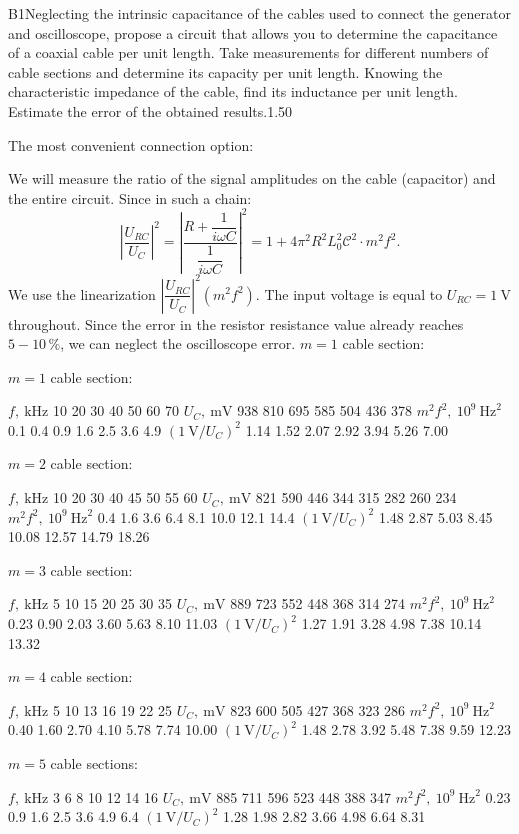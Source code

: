 \documentclass[11pt,a4paper]{article}
\begin{document}
\begin{solcard}{B1}{Neglecting the intrinsic capacitance of the cables used to connect the generator and oscilloscope, propose a circuit that allows you to determine the capacitance of a coaxial cable per unit length. Take measurements for different numbers of cable sections and determine its capacity per unit length. Knowing the characteristic impedance of the cable, find its inductance per unit length. Estimate the error of the obtained results.}{1.50}

The most convenient connection option:


We will measure the ratio of the signal amplitudes on the cable (capacitor) and the entire circuit. Since in such a chain: \[\left|\dfrac{U_{RC}}{U_{C}}\right|^2=\left|\dfrac{R+\dfrac{1}{i\omega C}}{\dfrac{1}{i\omega C}}\right|^2=1+4\pi^2R^2L_0^2\mathcal C^2\cdot m^2f^2.\]We use the linearization $\left|\dfrac{U_{RC}}{U_{C}}\right|^2\left(m^2f^2\right)$. The input voltage is equal to $U_{RC}=1~\mathrm{V}$ throughout. Since the error in the resistor resistance value already reaches $5-10\,\%$, we can neglect the oscilloscope error. $m=1$ cable section:


$m=1$ cable section:


$f,~\mathrm{kHz}$ 10 20 30 40 50 60 70 $U_{C}, ~\mathrm{mV}$ 938 810 695 585 504 436 378 $m^2f^2,~10^9~\mathrm{Hz}^2$ 0.1 0.4 0.9 1.6 2.5 3.6 4.9 $(1~\mathrm{V}/U_C)^2$ 1.14 1.52 2.07 2.92 3.94 5.26 7.00


$m=2$ cable section:


$f,~\mathrm{kHz}$ 10 20 30 40 45 50 55 60 $U_{C}, ~\mathrm{mV}$ 821 590 446 344 315 282 260 234 $m^2f^2,~10^9~\mathrm{Hz}^2$ 0.4 1.6 3.6 6.4 8.1 10.0 12.1 14.4 $(1~\mathrm{V}/U_C)^2$ 1.48 2.87 5.03 8.45 10.08 12.57 14.79 18.26


$m=3$ cable section:


$f,~\mathrm{kHz}$ 5 10 15 20 25 30 35 $U_{C}, ~\mathrm{mV}$ 889 723 552 448 368 314 274 $m^2f^2,~10^9~\mathrm{Hz}^2$ 0.23 0.90 2.03 3.60 5.63 8.10 11.03 $(1~\mathrm{V}/U_C)^2$ 1.27 1.91 3.28 4.98 7.38 10.14 13.32


$m=4$ cable section:


$f,~\mathrm{kHz}$ 5 10 13 16 19 22 25 $U_{C}, ~\mathrm{mV}$ 823 600 505 427 368 323 286 $m^2f^2,~10^9~\mathrm{Hz}^2$ 0.40 1.60 2.70 4.10 5.78 7.74 10.00 $(1~\mathrm{V}/U_C)^2$ 1.48 2.78 3.92 5.48 7.38 9.59 12.23


$m=5$ cable sections:


$f,~\mathrm{kHz}$ 3 6 8 10 12 14 16 $U_{C}, ~\mathrm{mV}$ 885 711 596 523 448 388 347 $m^2f^2,~10^9~\mathrm{Hz}^2$ 0.23 0.9 1.6 2.5 3.6 4.9 6.4 $(1~\mathrm{V}/U_C)^2$ 1.28 1.98 2.82 3.66 4.98 6.64 8.31



\end{solcard}
\end{document}

